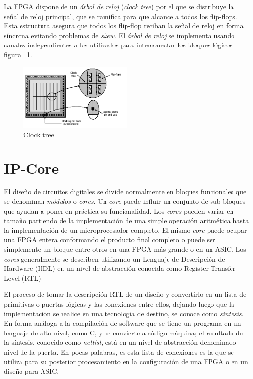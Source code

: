 La FPGA dispone de un \textit{árbol de reloj} (\textit{clock tree})
por el que se distribuye la señal de reloj principal, que se
ramifica para que alcance a todos los flip-flops. Esta estructura
asegura que todos los flip-flop reciban la señal de reloj en forma
síncrona evitando problemas de \textit{skew}. El \textit{árbol de
  reloj} se implementa usando canales independientes a los
utilizados para interconectar los bloques lógicos figura
~\ref{fig:ctree}.

\begin{figure}[h!]
\begin{center}
\includegraphics[width=0.5\textwidth,keepaspectratio=true]{./images/clocktree}
\caption{Clock tree}
\label{fig:ctree}
\end{center}
\end{figure}



\section{IP-Core}
El diseño de circuitos digitales se divide normalmente en bloques
funcionales que se denominan \textit{módulos} o \textit{cores}. Un
\textit{core} puede influir un conjunto de sub-bloques que ayudan a
poner en práctica su funcionalidad. Los \textit{cores} pueden variar
en tamaño partiendo de la implementación de una simple operación
aritmética hasta la implementación de un microprocesador completo. El
mismo \textit{core} puede ocupar una FPGA entera conformando el
producto final completo o puede ser simplemente un bloque entre otros
en una FPGA más grande o en un ASIC. Los \textit{cores} generalmente se describen utilizando un Lenguaje de Descripción de Hardware (HDL)
en un nivel de abstracción conocida como Register Transfer Level
(RTL).
	
El proceso de tomar la descripción RTL de un diseño y convertirlo en
un lista de primitivas o puertas lógicas y las conexiones entre ellos,
dejando luego que la implementación se realice en una tecnología de
destino, se conoce como \textit{síntesis}. En forma análoga a la
compilación de software que se tiene un programa en un lenguaje de
alto nivel, como C, y se convierte a código máquina; el resultado de
la síntesis, conocido como \textit{netlist}, está en un nivel de
abstracción denominado nivel de la puerta. En pocas palabras, es esta
lista de conexiones es la que se utiliza para su posterior procesamiento
en la configuración de una FPGA o en un diseño para ASIC.
	
